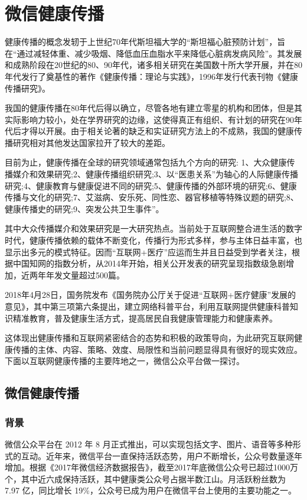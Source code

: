 \section{微信健康传播}
健康传播的概念发轫于上世纪70年代斯坦福大学的“斯坦福心脏预防计划”，旨在“通过减轻体重、减少吸烟、降低血压血脂水平来降低心脏病发病风险”。其发展和成熟阶段在20世纪的80、90年代，诸多相关研究在美国数十所大学开展，并在80年代发行了奠基性的著作《健康传播：理论与实践》，1996年发行代表刊物《健康传播研究》。

我国的健康传播在80年代后得以确立，尽管各地有建立零星的机构和团体，但是其实际影响力较小，处在学界研究的边缘，这使得真正有组织、有计划的研究在90年代后才得以开展。由于相关论著的缺乏和实证研究方法上的不成熟，我国的健康传播研究相对其他发达国家拉开了较大的差距。

目前为止，健康传播在全球的研究领域通常包括九个方向的研究: 1、大众健康传播媒介和效果研究;2、健康传播组织研究;3、以“医患关系”为轴心的人际健康传播研究;4、健康教育与健康促进不同的研究;5、健康传播的外部环境的研究;6、健康传播与文化的研究;7、艾滋病、安乐死、同性恋、器官移植等特殊议题的研究;8、健康传播史的研究;9、突发公共卫生事件”。\cite{张自力2005}

其中大众传播媒介和效果研究是一大研究热点。当前处于互联网整合进生活的数字时代，健康传播依赖的载体不断变化，传播行为形式多样，参与主体日益丰富，也显示出多元的模式特征。因而“互联网+医疗”应运而生并且日益受到学者关注，根据中国知网的指数分析，从2014年开始，相关公开发表的研究呈现指数级急剧增加，近两年年发文量超过500篇。

2018年4月28日，国务院发布《国务院办公厅关于促进“互联网+医疗健康”发展的意见》，其中第三项第六条提出，建立网络科普平台，利用互联网提供健康科普知识精准教育，普及健康生活方式，提高居民自我健康管理能力和健康素养。\cite{互联网+}

这体现出健康传播和互联网紧密结合的态势和积极的政策导向，为此研究互联网健康传播的主体、内容、策略、效度、局限性和当前问题显得具有很好的现实效应。下面以互联网健康传播的主要阵地之一，微信公众平台做一探讨。
\subsection{微信健康传播}
\subsubsection{背景}
微信公众平台在 2012 年 8 月正式推出，可以实现包括文字、图片、语音等多种形式的互动。近年来，微信平台一直保持活跃态势，用户不断增长，公众号数量逐年增加。根据《2017年微信经济数据报告》，截至2017年底微信公众号已超过1000万个，其中近六成保持活跃，其中健康类公众号占据半数江山。月活跃粉丝数为 7.97 亿，同比增长 19\%，公众号已成为用户在微信平台上使用的主要功能之一。

